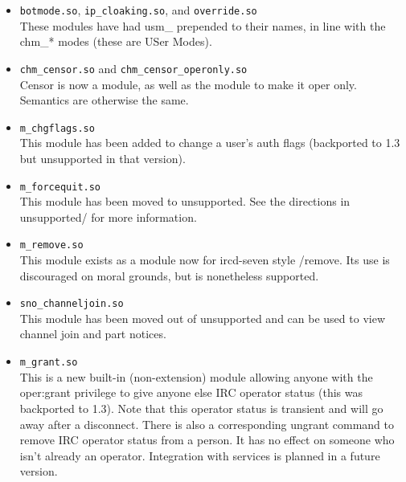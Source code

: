 \begin{itemize}


\item{\nolinkurl{botmode.so}, \nolinkurl{ip\_cloaking.so}, and
      \nolinkurl{override.so} \\
	These modules have had usm\_ prepended to their names, in line with the
	chm\_* modes (these are USer Modes).
}

\item{\nolinkurl{chm\_censor.so} and \nolinkurl{chm\_censor\_operonly.so} \\
	Censor is now a module, as well as the module to make it oper only.
	Semantics are otherwise the same.
}

\item{\nolinkurl{m\_chgflags.so} \\
	This module has been added to change a user's auth flags (backported
	to 1.3 but unsupported in that version).
}

\item{\nolinkurl{m\_forcequit.so} \\
	This module has been moved to unsupported. See the directions in
	unsupported/ for more information.
}

\item{\nolinkurl{m\_remove.so} \\
	This module exists as a module now for ircd-seven style /remove. Its
	use is discouraged on moral grounds, but is nonetheless supported.
}

\item{\nolinkurl{sno\_channeljoin.so} \\
	This module has been moved out of unsupported and can be used to view
	channel join and part notices.
}

\item{\nolinkurl{m_grant.so} \\
	This is a new built-in (non-extension) module allowing anyone with the
	oper:grant privilege to give anyone else IRC operator status (this was
	backported to 1.3). Note that this operator status is transient and
	will go away after a disconnect.
	There is also a corresponding ungrant command to remove IRC operator
	status from a person. It has no effect on someone who isn't already an
	operator. Integration with services is planned in a future version.
}

\end{itemize}

